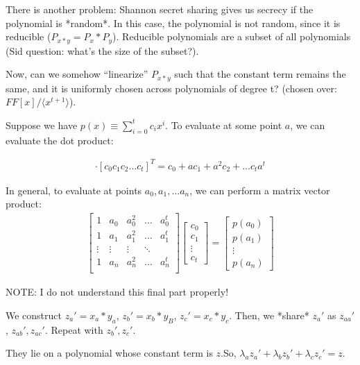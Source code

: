 There is another problem: Shannon secret sharing gives us secrecy if the polynomial is *random*.
In this case, the polynomial is not random, since it is reducible ($P_{x * y} = P_x * P_y$). Reducible
polynomials are a subset of all polynomials (Sid question: what's the size of the subset?).


Now, can we somehow ``linearize'' $P_{x * y}$ such that the  constant term remains the same,
and it is uniformly chosen across polynomials of degree t? (chosen over: $FF[x] / \langle x^{t+1} \rangle$).

Suppose we have $p(x) \equiv \sum_{i=0}^t c_i x^i$. To evaluate at some point $a$,
we can evaluate the dot product:

\begin{align*}
    [1 a a^2 \dots a^t] \cdot [c_0 c_1 c_2 \dots c_t]^T = c_0 + a c_1 + a^2 c_2 + \dots c_t a^t
\end{align*}

In general, to evaluate at points $a_0, a_1, \dots a_n$, we can perform a matrix vector product:
\begin{align*}
    \begin{bmatrix}
        1 & a_0 & a_0^2 & \dots & a_0^t \\
        1 & a_1 & a_1^2 & \dots & a_1^t \\
        \vdots & \vdots & \vdots & \ddots \\
        1 & a_n & a_n^2 & \dots & a_n^t \\
    \end{bmatrix}
    \begin{bmatrix}
        c_0 \\ c_1 \\ \vdots \\ c_t
    \end{bmatrix}
    = \begin{bmatrix} p(a_0) \\ p(a_1) \\ \vdots \\ p(a_n) \end{bmatrix}
\end{align*}


NOTE: I do not understand this final part properly!


We construct $z_a' = x_a * y_a$, $z_b' = x_b * y_B$, $z_c' = x_c * y_c$.
Then, we *share* $z_a'$ as $z_{aa}'$, $z_{ab}', z_{ac}'$. Repeat with $z_{b}', z_{c}'$.

They lie on a polynomial whose constant term is $z$.So,
$\lambda_a z_a' + \lambda_b z_b' + \lambda_c z_c' = z$.

